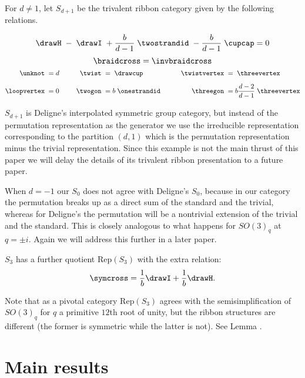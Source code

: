 \documentclass[12pt]{amsart}
\begin{document}
\begin{definition}
For $d \neq 1$, let  $S_{d+1}$ be the trivalent ribbon category given by the following relations.

$$  \drawH \; - \; \drawI \; + \frac{b}{d-1}\; \twostrandid \; -  \frac{b}{d-1}\; \cupcap = 0$$
$$\braidcross  =  \invbraidcross$$
\begin{align*}
    \unknot\; &= d &\qquad
      \twist\; &=  \;\drawcup&\qquad
        \twistvertex\; &=  \;\threevertex\\[5pt]
    \loopvertex\;&=0&
      \twogon\;&= b\;\onestrandid&
        \threegon\; &= b \frac{d-2}{d-1}\;\threevertex
\end{align*}
\end{definition}

$S_{d+1}$ is Deligne's interpolated symmetric group category, but instead of the permutation representation as the generator we use the irreducible representation corresponding to the partition $(d,1)$ which is the permutation representation minus the trivial representation.    Since this example is not the main thrust of this paper we will delay the details of its trivalent ribbon presentation to a future paper.

\begin{warning}
When $d=-1$ our $S_0$ does not agree with Deligne's $S_0$, because in our category the permutation breaks up as a direct sum of the standard and the trivial, whereas for Deligne's the permutation will be a nontrivial extension of the trivial and the standard.  This is closely analogous to what happens for $SO(3)_q$ at $q=\pm i$.  Again we will address this further in a later paper.
\end{warning}

\begin{definition}
$S_{3}$ has a further quotient $\mathrm{Rep}(S_3)$ with the extra relation:
$$\symcross = \frac{1}{b}\drawI + \frac{1}{b}\drawH.$$
\end{definition}

Note that as a pivotal category $\mathrm{Rep}(S_3)$ agrees with the semisimplification of $SO(3)_q$ for $q$ a primitive $12$th root of unity, but the ribbon structures are different (the former is symmetric while the latter is not).  See Lemma .






\section{Main results}
\end{document}
